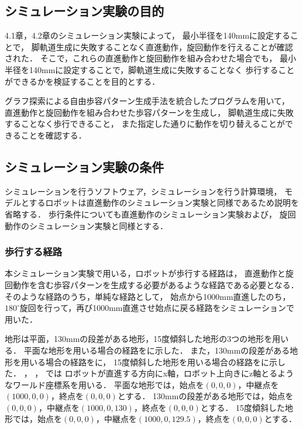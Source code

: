 
\subsection{シミュレーション実験の目的}
4.1章，4.2章のシミュレーション実験によって，
最小半径を140mmに設定することで，
脚軌道生成に失敗することなく直進動作，旋回動作を行えることが確認された．
そこで，これらの直進動作と旋回動作を組み合わせた場合でも，
最小半径を140mmに設定することで，脚軌道生成に失敗することなく
歩行することができるかを検証することを目的とする．

グラフ探索による自由歩容パターン生成手法を統合したプログラムを用いて，
直進動作と旋回動作を組み合わせた歩容パターンを生成し，
脚軌道生成に失敗することなく歩行できること，
また指定した通りに動作を切り替えることができることを確認する．

\subsection{シミュレーション実験の条件}
シミュレーションを行うソフトウェア，シミュレーションを行う計算環境，
モデルとするロボットは直進動作のシミュレーション実験と同様であるため説明を省略する．
歩行条件についても直進動作のシミュレーション実験および，
旋回動作のシミュレーション実験と同様とする．

\subsubsection{歩行する経路}
本シミュレーション実験で用いる，ロボットが歩行する経路は，
直進動作と旋回動作を含む歩容パターンを生成する必要があるような経路である必要となる．
そのような経路のうち，単純な経路として，
始点から1000mm直進したのち，$180^{\circ}$旋回を行って，再び1000mm直進させ始点に戻る経路をシミュレーションで用いた．

地形は平面，130mmの段差がある地形，15度傾斜した地形の3つの地形を用いる．
平面な地形を用いる場合の経路をに示した．
また，130mmの段差がある地形を用いる場合の経路をに，
15度傾斜した地形を用いる場合の経路をに示した．
，
，
では
ロボットが直進する方向にx軸，ロボット上向きにz軸とるようなワールド座標系を用いる．
平面な地形では，始点を$(0,0,0)$，中継点を$(1000,0,0)$，終点を$(0,0,0)$とする．
130mmの段差がある地形では，始点を$(0,0,0)$，中継点を$(1000,0,130)$，終点を$(0,0,0)$とする．
15度傾斜した地形では，始点を$(0,0,0)$，中継点を$(1000,0,129.5)$，終点を$(0,0,0)$とする．

